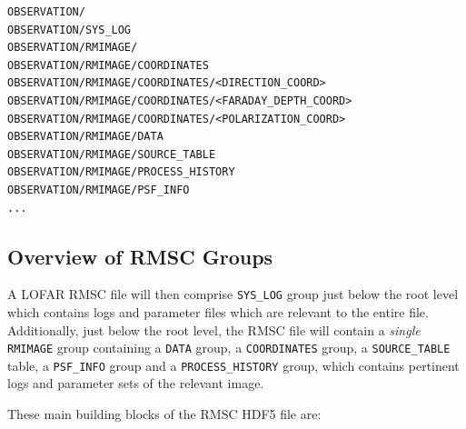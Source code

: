 \documentclass[a4paper,10pt,bibtotoc]{scrartcl}
\begin{document}
\begin{lstlisting}
OBSERVATION/
OBSERVATION/SYS_LOG
OBSERVATION/RMIMAGE/
OBSERVATION/RMIMAGE/COORDINATES
OBSERVATION/RMIMAGE/COORDINATES/<DIRECTION_COORD>
OBSERVATION/RMIMAGE/COORDINATES/<FARADAY_DEPTH_COORD>
OBSERVATION/RMIMAGE/COORDINATES/<POLARIZATION_COORD>
OBSERVATION/RMIMAGE/DATA
OBSERVATION/RMIMAGE/SOURCE_TABLE
OBSERVATION/RMIMAGE/PROCESS_HISTORY
OBSERVATION/RMIMAGE/PSF_INFO
...
\end{lstlisting}

\subsection{Overview of RMSC Groups}

A LOFAR RMSC file will then comprise \verb|SYS_LOG| group just below the root level which contains logs and parameter files which are relevant to the entire file.  Additionally, just below the root level, the RMSC file will contain a \textit{single} \texttt{RMIMAGE} group containing a \texttt{DATA} group, a \texttt{COORDINATES} group, a \verb|SOURCE_TABLE| table, a \verb|PSF_INFO| group and a \verb|PROCESS_HISTORY| group, which contains pertinent logs and parameter sets of the relevant image.

These main building blocks of the RMSC HDF5 file are:
\end{document}
